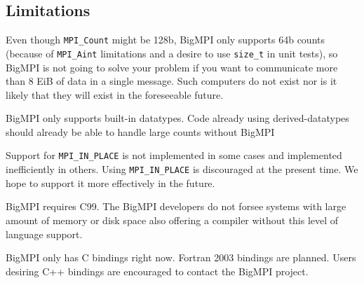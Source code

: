 \subsection{Limitations}

Even though \texttt{MPI\_Count} might be 128b, BigMPI only supports
64b counts (because of \texttt{MPI\_Aint} limitations and a desire to use \texttt{size\_t}
in unit tests), so BigMPI is not going to solve your problem if you
want to communicate more than 8 EiB of data in a single message.
Such computers do not exist nor is it likely that they will exist
in the foreseeable future.

BigMPI only supports built-in datatypes.  Code already using
derived-datatypes should already be able to handle large
counts without BigMPI 

Support for \texttt{MPI\_IN\_PLACE} is not implemented in some cases and
implemented inefficiently in others.
Using \texttt{MPI\_IN\_PLACE} is discouraged at the present time.
We hope to support it more effectively in the future.

BigMPI requires C99.  The BigMPI developers do not forsee systems with large
amount of memory or disk space also offering a compiler without this level of language support.

BigMPI only has C bindings right now.
Fortran 2003 bindings are planned.
Users desiring C++ bindings are encouraged to contact the BigMPI project.
